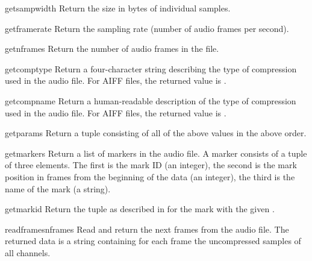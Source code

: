 \begin{methoddesc}[aifc]{getsampwidth}{}
Return the size in bytes of individual samples.
\end{methoddesc}

\begin{methoddesc}[aifc]{getframerate}{}
Return the sampling rate (number of audio frames per second).
\end{methoddesc}

\begin{methoddesc}[aifc]{getnframes}{}
Return the number of audio frames in the file.
\end{methoddesc}

\begin{methoddesc}[aifc]{getcomptype}{}
Return a four-character string describing the type of compression used
in the audio file.  For AIFF files, the returned value is
.
\end{methoddesc}

\begin{methoddesc}[aifc]{getcompname}{}
Return a human-readable description of the type of compression used in
the audio file.  For AIFF files, the returned value is .
\end{methoddesc}

\begin{methoddesc}[aifc]{getparams}{}
Return a tuple consisting of all of the above values in the above
order.
\end{methoddesc}

\begin{methoddesc}[aifc]{getmarkers}{}
Return a list of markers in the audio file.  A marker consists of a
tuple of three elements.  The first is the mark ID (an integer), the
second is the mark position in frames from the beginning of the data
(an integer), the third is the name of the mark (a string).
\end{methoddesc}

\begin{methoddesc}[aifc]{getmark}{id}
Return the tuple as described in  for the mark
with the given .
\end{methoddesc}

\begin{methoddesc}[aifc]{readframes}{nframes}
Read and return the next  frames from the audio file.  The
returned data is a string containing for each frame the uncompressed
samples of all channels.
\end{methoddesc}

